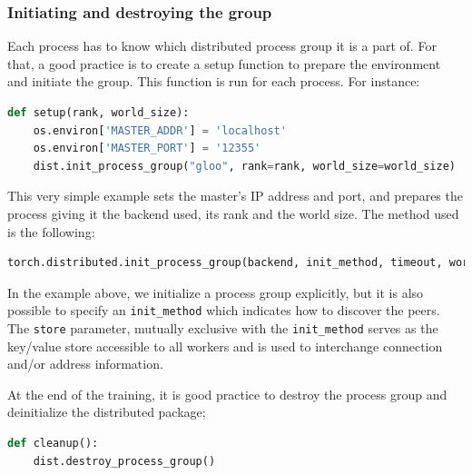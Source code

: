 \documentclass{article}
\begin{document}
\subsubsection{Initiating and destroying the group}
Each process has to know which distributed process group it is a part of. For that, a good practice is to create a setup function to prepare the environment and initiate the group. This function is run for each process. For instance:
\begin{lstlisting}[language=Python]
  def setup(rank, world_size):
    os.environ['MASTER_ADDR'] = 'localhost'
    os.environ['MASTER_PORT'] = '12355'
    dist.init_process_group("gloo", rank=rank, world_size=world_size)
\end{lstlisting}
This very simple example sets the master's IP address and port, and prepares the process giving it the backend used, its rank and the world size.
The method used is the following:
\begin{lstlisting}[language=Python]
  torch.distributed.init_process_group(backend, init_method, timeout, world_size, rank, store, group_name, pg_options)
\end{lstlisting}
In the example above, we initialize a process group explicitly, but it is also possible to specify an \lstinline{init_method} which indicates how to discover the peers. The \lstinline{store} parameter, mutually exclusive with the \lstinline{init_method} serves as the key/value store accessible to all workers and is used to interchange connection and/or address information.

At the end of the training, it is good practice to destroy the process group and deinitialize the distributed package;
\begin{lstlisting}[language=Python]
  def cleanup():
    dist.destroy_process_group()
\end{lstlisting}
\end{document}
